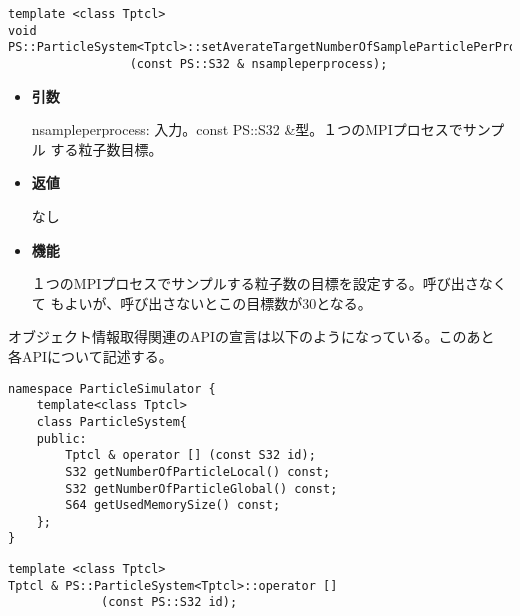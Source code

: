 
\begin{screen}
\begin{verbatim}
template <class Tptcl>
void PS::ParticleSystem<Tptcl>::setAverateTargetNumberOfSampleParticlePerProcess
                 (const PS::S32 & nsampleperprocess);
\end{verbatim}
\end{screen}

\begin{itemize}

\item {\bf 引数}

nsampleperprocess: 入力。const PS::S32 \&型。１つのMPIプロセスでサンプル
する粒子数目標。

\item {\bf 返値}

なし

\item {\bf 機能}

１つのMPIプロセスでサンプルする粒子数の目標を設定する。呼び出さなくて
もよいが、呼び出さないとこの目標数が30となる。

\end{itemize}


オブジェクト情報取得関連のAPIの宣言は以下のようになっている。このあと
各APIについて記述する。

\begin{lstlisting}[caption=ParticleSystem2]
namespace ParticleSimulator {
    template<class Tptcl>
    class ParticleSystem{
    public:
        Tptcl & operator [] (const S32 id);
        S32 getNumberOfParticleLocal() const;
        S32 getNumberOfParticleGlobal() const;
        S64 getUsedMemorySize() const;
    };
}
\end{lstlisting}


\begin{screen}
\begin{verbatim}
template <class Tptcl>
Tptcl & PS::ParticleSystem<Tptcl>::operator []
             (const PS::S32 id);
\end{verbatim}
\end{screen}

